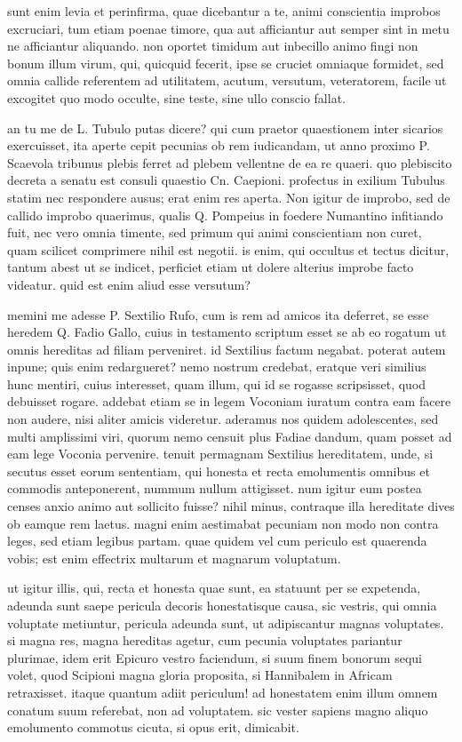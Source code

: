  sunt enim levia et perinfirma, quae dicebantur a te, animi conscientia improbos excruciari, tum etiam poenae timore, qua aut afficiantur aut semper sint in metu ne afficiantur aliquando. non oportet timidum aut inbecillo animo fingi non bonum illum virum, qui, quicquid fecerit, ipse se cruciet omniaque formidet, sed omnia callide referentem ad utilitatem, acutum, versutum, veteratorem, facile ut excogitet quo modo occulte, sine teste, sine ullo conscio fallat.

 an tu me de L. Tubulo putas dicere? qui cum praetor quaestionem inter sicarios exercuisset, ita aperte cepit pecunias ob rem iudicandam, ut anno proximo P. Scaevola tribunus plebis ferret ad plebem vellentne de ea re quaeri. quo plebiscito decreta a senatu est consuli quaestio Cn. Caepioni. profectus in exilium Tubulus statim nec respondere ausus; erat enim res aperta. Non igitur de improbo, sed de callido improbo quaerimus, qualis Q. Pompeius in foedere Numantino infitiando fuit, nec vero omnia timente, sed primum qui animi conscientiam non curet, quam scilicet comprimere nihil est negotii. is enim, qui occultus et tectus dicitur, tantum abest ut se indicet, perficiet etiam ut dolere alterius improbe facto videatur. quid est enim aliud esse versutum?

 memini me adesse P. Sextilio Rufo, cum is rem ad amicos ita deferret, se esse heredem Q. Fadio Gallo, cuius in testamento scriptum esset se ab eo rogatum ut omnis hereditas ad filiam perveniret. id Sextilius factum negabat. poterat autem inpune; quis enim redargueret? nemo nostrum credebat, eratque veri similius hunc mentiri, cuius interesset, quam illum, qui id se rogasse scripsisset, quod debuisset rogare. addebat etiam se in legem Voconiam iuratum contra eam facere non audere, nisi aliter amicis videretur. aderamus nos quidem adolescentes, sed multi amplissimi viri, quorum nemo censuit plus Fadiae dandum, quam posset ad eam lege Voconia pervenire. tenuit permagnam Sextilius hereditatem, unde, si secutus esset eorum sententiam, qui honesta et recta emolumentis omnibus et commodis anteponerent, nummum nullum attigisset. num igitur eum postea censes anxio animo aut sollicito fuisse? nihil minus, contraque illa hereditate dives ob eamque rem laetus. magni enim aestimabat pecuniam non modo non contra leges, sed etiam legibus partam. quae quidem vel cum periculo est quaerenda vobis; est enim effectrix multarum et magnarum voluptatum.

 ut igitur illis, qui, recta et honesta quae sunt, ea statuunt per se expetenda, adeunda sunt saepe pericula decoris honestatisque causa, sic vestris, qui omnia voluptate metiuntur, pericula adeunda sunt, ut adipiscantur magnas voluptates. si magna res, magna hereditas agetur, cum pecunia voluptates pariantur plurimae, idem erit Epicuro vestro faciendum, si suum finem bonorum sequi volet, quod Scipioni magna gloria proposita, si Hannibalem in Africam retraxisset. itaque quantum adiit periculum! ad honestatem enim illum omnem conatum suum referebat, non ad voluptatem. sic vester sapiens magno aliquo emolumento commotus cicuta, si opus erit, dimicabit.

